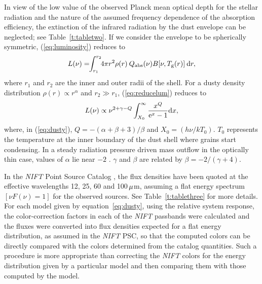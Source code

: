 \documentclass[useAMS,usenatbib]{biom}
\begin{document}
In view of the low value of the observed Planck mean  optical depth for
the stellar radiation and the nature of the assumed frequency
dependence of the absorption efficiency, the extinction of the infrared
radiation by the dust envelope can be neglected; see Table~\ref{t:tabletwo}. If we consider the
envelope to be spherically symmetric, (\ref{eq:luminosity}) reduces to
\begin{equation}
   L(\nu)=\!\!\int_{r_{1}}^{r_{2}}\!\!4\upi r^2\rho(r)\> Q_{\rmn{abs}}(\nu)B[\nu,T_{\rmn{g}}(r)]\> {\rmn{d}}r,
\label{eq:reducelum}
\end{equation}
where $r_1$ and $r_2$ are the inner and
outer radii of the shell. For a dusty density distribution
$\rho(r)\propto r^{\alpha}$ and $r_2\gg r_1$, (\ref{eq:reducelum}) reduces to
\begin{equation}
   L(\nu)\propto \nu^{2+\gamma-Q}\int_{X_0}^{\infty}{{x^Q}\over
   {\rmn{e}^x-1}}\rmn{d}x ,
\label{eq:dusty}
\end{equation}
where, in (\ref{eq:dusty}), $Q=-(\alpha+\beta+3)/\beta$ and $X_0=(h\nu
/kT_0)$. $T_0$ represents the temperature at the inner boundary of the
dust shell where grains start condensing. In a steady radiation
pressure driven mass outflow in the optically thin case, values of
$\alpha$ lie near $-2$ \citep{b8}. $\gamma$ and $\beta$ are related by
$\beta=-2/(\gamma+4)$.

In the {\it NIFT\/} Point Source Catalog \citep[PSC;][]{b2}, the flux
densities have been quoted at the effective wavelengths 12, 25, 60 and
\hbox{100\,$\mu$m}, assuming a flat energy spectrum $[\nu F(\nu)=1]$
for the observed sources. See Table~\ref{t:tablethree} for more
details. For each model given by equation~\ref{eq:dusty}, using the relative
system response, the color-correction factors in each of the {\it
NIFT\/} passbands were calculated and the fluxes were converted into
flux densities expected for a flat energy distribution, as assumed in
the {\it NIFT\/} PSC, so that the computed colors can be directly
compared with the colors determined from the catalog
quantities. Such a procedure is more appropriate than correcting the
{\it NIFT\/} colors for the energy distribution given by a particular
model and then comparing them with those computed by the model.\vspace*{-6pt}
\end{document}
